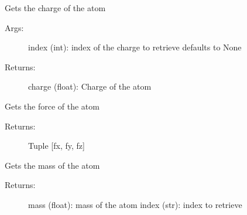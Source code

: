 \documentclass[letterpaper,10pt,english]{sphinxmanual}
\begin{document}
\begin{fulllineitems}

\begin{fulllineitems}
\label{atom:ctools.Atom.Atom.getCharge}
Gets the charge of the atom
\begin{description}
\item[{Args:}] \leavevmode
index (int): index of the charge to retrieve defaults to None

\item[{Returns:}] \leavevmode
charge (float): Charge of the atom

\end{description}

\end{fulllineitems}



\begin{fulllineitems}
\label{atom:ctools.Atom.Atom.getEpsilon}
\end{fulllineitems}



\begin{fulllineitems}
\label{atom:ctools.Atom.Atom.getForce}
Gets the force of the atom
\begin{description}
\item[{Returns:}] \leavevmode
Tuple {[}fx, fy, fz{]}

\end{description}

\end{fulllineitems}



\begin{fulllineitems}
\label{atom:ctools.Atom.Atom.getMass}
Gets the mass of the atom
\begin{description}
\item[{Returns:}] \leavevmode
mass (float): mass of the atom
index (str): index to retrieve

\end{description}

\end{fulllineitems}



\end{fulllineitems}
\end{document}
